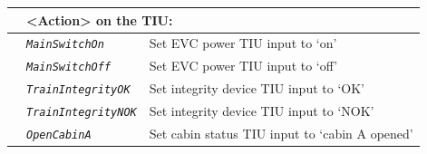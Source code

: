\documentclass{template/openetcs}
\begin{document}
\begin{itemize}
\begin{longtable}{|l|l|l|}
			\hline
			
			&	\multicolumn{2}{l|}{ \begin{minipage}[t]{0.78\linewidth} <Action> on the TIU: \end{minipage} } \\
			
			\hline
			
			&	\begin{minipage}[t]{0.40\linewidth} \emph{\texttt{MainSwitchOn}} \end{minipage}
			&	\begin{minipage}[t]{0.38\linewidth} Set EVC power TIU input to ‘on’ \end{minipage} \\
			
			\hline
			
			&	\begin{minipage}[t]{0.40\linewidth} \emph{\texttt{MainSwitchOff}} \end{minipage}
			&	\begin{minipage}[t]{0.38\linewidth} Set EVC power TIU input to ‘off’\end{minipage} \\
			
			\hline
			
			&	\begin{minipage}[t]{0.40\linewidth} \emph{\texttt{TrainIntegrityOK}} \end{minipage}
			&	\begin{minipage}[t]{0.38\linewidth} Set integrity device TIU input to ‘OK’ \end{minipage}\\
			
			\hline
			
			&	\begin{minipage}[t]{0.40\linewidth} \emph{\texttt{TrainIntegrityNOK}} \end{minipage}
			&	\begin{minipage}[t]{0.38\linewidth} Set integrity device TIU input to ‘NOK’ \end{minipage} \\
			
			\hline
			
			&	\begin{minipage}[t]{0.40\linewidth} \emph{\texttt{OpenCabinA}} \end{minipage}
			&	\begin{minipage}[t]{0.38\linewidth} Set cabin status TIU input to ‘cabin A opened’ \end{minipage} \\
			

\end{longtable}
\end{itemize}
\end{document}
